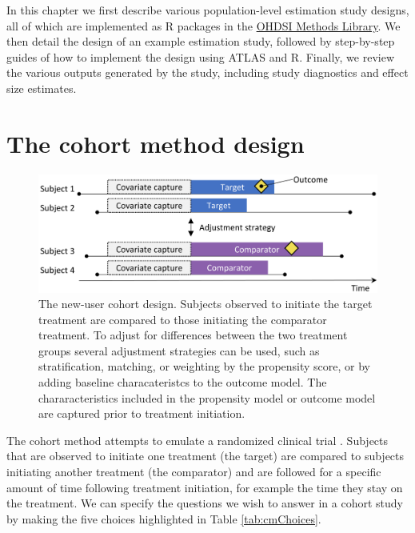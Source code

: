 \documentclass[11pt]{book}
\theoremstyle{definition}
\theoremstyle{definition}
\theoremstyle{definition}
\theoremstyle{remark}
\begin{document}
In this chapter we first describe various population-level estimation study designs, all of which are implemented as R packages in the \href{https://ohdsi.github.io/MethodsLibrary/}{OHDSI Methods Library}. We then detail the design of an example estimation study, followed by step-by-step guides of how to implement the design using ATLAS and R. Finally, we review the various outputs generated by the study, including study diagnostics and effect size estimates.

\hypertarget{CohortMethod}{%
\section{The cohort method design}\label{CohortMethod}}


\begin{figure}

{\centering \includegraphics[width=0.9\linewidth]{images/PopulationLevelEstimation/cohortMethod} 

}

\caption{The new-user cohort design. Subjects observed to initiate the target treatment are compared to those initiating the comparator treatment. To adjust for differences between the two treatment groups several adjustment strategies can be used, such as stratification, matching, or weighting by the propensity score, or by adding baseline characateristcs to the outcome model. The chararacteristics included in the propensity model or outcome model are captured prior to treatment initiation.}\label{fig:cohortMethod}
\end{figure}

The cohort method attempts to emulate a randomized clinical trial \citep{hernan_2016}. Subjects that are observed to initiate one treatment (the target) are compared to subjects initiating another treatment (the comparator) and are followed for a specific amount of time following treatment initiation, for example the time they stay on the treatment. We can specify the questions we wish to answer in a cohort study by making the five choices highlighted in Table \ref{tab:cmChoices}.   
\end{document}
